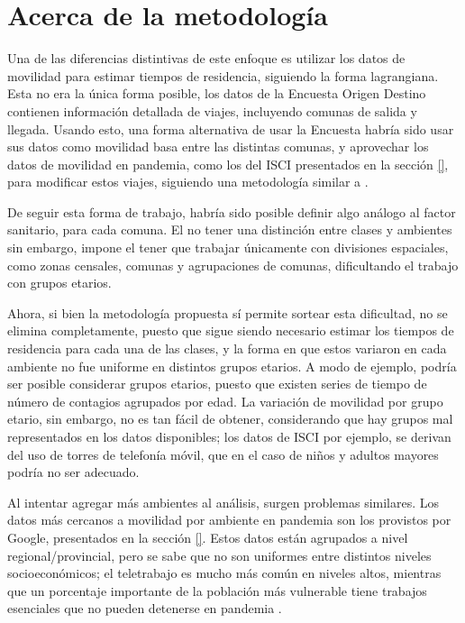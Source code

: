 \section{Acerca de la metodología}\label{dis:metod}

  



Una de las diferencias distintivas de este enfoque es utilizar los datos de movilidad para estimar tiempos de residencia, siguiendo la forma lagrangiana. Esta no era la única forma posible, los datos de la Encuesta Origen Destino contienen información detallada de viajes, incluyendo comunas de salida y llegada. Usando esto, una forma alternativa de usar la Encuesta habría sido usar sus datos como movilidad basa entre las distintas comunas, y aprovechar los datos de movilidad en pandemia, como los del ISCI presentados en la sección \ref{}, para modificar estos viajes, siguiendo una metodología similar a \cite{Lai2020}.


De seguir esta forma de trabajo, habría sido posible definir algo análogo al factor sanitario, para cada comuna. El no tener una distinción entre clases y ambientes sin embargo, impone el tener que trabajar únicamente con divisiones espaciales, como zonas censales, comunas y agrupaciones de comunas, dificultando el trabajo con grupos etarios.

Ahora, si bien la metodología propuesta sí permite sortear esta dificultad, no se elimina completamente, puesto que sigue siendo necesario estimar los tiempos de residencia para cada una de las clases, y la forma en que estos variaron en cada ambiente no fue uniforme en distintos grupos etarios. A modo de ejemplo, podría ser posible considerar grupos etarios, puesto que existen series de tiempo de número de contagios agrupados por edad. La variación de movilidad por grupo etario, sin embargo, no es tan fácil de obtener, considerando que hay grupos mal representados en los datos disponibles; los datos de ISCI por ejemplo, se derivan del uso de torres de telefonía móvil, que en el caso de niños y adultos mayores podría no ser adecuado.

Al intentar agregar más ambientes al análisis, surgen problemas similares. Los datos más cercanos a movilidad por ambiente en pandemia son los provistos por Google, presentados en la sección \ref{}. Estos datos están agrupados a nivel regional/provincial, pero se sabe \cite{Olivares2020} que no son uniformes entre distintos niveles socioeconómicos; el teletrabajo es mucho más común en niveles altos, mientras que un porcentaje importante de la población más vulnerable tiene trabajos esenciales que no pueden detenerse en pandemia \cite{}.

